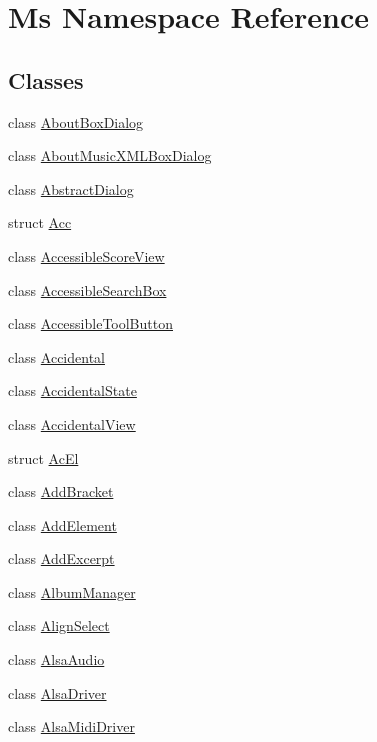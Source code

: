 \hypertarget{namespace_ms}{}\section{Ms Namespace Reference}
\label{namespace_ms}
\subsection*{Classes}
\begin{DoxyCompactItemize}
\item 
class \hyperlink{class_ms_1_1_about_box_dialog}{About\+Box\+Dialog}
\item 
class \hyperlink{class_ms_1_1_about_music_x_m_l_box_dialog}{About\+Music\+X\+M\+L\+Box\+Dialog}
\item 
class \hyperlink{class_ms_1_1_abstract_dialog}{Abstract\+Dialog}
\item 
struct \hyperlink{struct_ms_1_1_acc}{Acc}
\item 
class \hyperlink{class_ms_1_1_accessible_score_view}{Accessible\+Score\+View}
\item 
class \hyperlink{class_ms_1_1_accessible_search_box}{Accessible\+Search\+Box}
\item 
class \hyperlink{class_ms_1_1_accessible_tool_button}{Accessible\+Tool\+Button}
\item 
class \hyperlink{class_ms_1_1_accidental}{Accidental}
\item 
class \hyperlink{class_ms_1_1_accidental_state}{Accidental\+State}
\item 
class \hyperlink{class_ms_1_1_accidental_view}{Accidental\+View}
\item 
struct \hyperlink{struct_ms_1_1_ac_el}{Ac\+El}
\item 
class \hyperlink{class_ms_1_1_add_bracket}{Add\+Bracket}
\item 
class \hyperlink{class_ms_1_1_add_element}{Add\+Element}
\item 
class \hyperlink{class_ms_1_1_add_excerpt}{Add\+Excerpt}
\item 
class \hyperlink{class_ms_1_1_album_manager}{Album\+Manager}
\item 
class \hyperlink{class_ms_1_1_align_select}{Align\+Select}
\item 
class \hyperlink{class_ms_1_1_alsa_audio}{Alsa\+Audio}
\item 
class \hyperlink{class_ms_1_1_alsa_driver}{Alsa\+Driver}
\item 
class \hyperlink{class_ms_1_1_alsa_midi_driver}{Alsa\+Midi\+Driver}

\end{DoxyCompactItemize}
